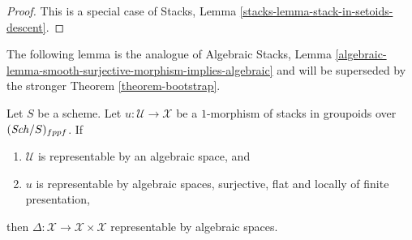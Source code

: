 \begin{proof}
This is a special case of
Stacks, Lemma \ref{stacks-lemma-stack-in-setoids-descent}.
\end{proof}

\noindent
The following lemma is the analogue of
Algebraic Stacks, Lemma
\ref{algebraic-lemma-smooth-surjective-morphism-implies-algebraic}
and will be superseded by the stronger
Theorem \ref{theorem-bootstrap}.

\begin{lemma}
\label{lemma-flat-finite-presentation-surjective-diagonal}
Let $S$ be a scheme.
Let $u : \mathcal{U} \to \mathcal{X}$ be a $1$-morphism of
stacks in groupoids over $(\mathit{Sch}/S)_{fppf}$. If
\begin{enumerate}
\item $\mathcal{U}$ is representable by an algebraic space, and
\item $u$ is representable by algebraic spaces, surjective, flat and
locally of finite presentation,
\end{enumerate}
then
$\Delta : \mathcal{X} \to \mathcal{X} \times \mathcal{X}$
representable by algebraic spaces.
\end{lemma}

